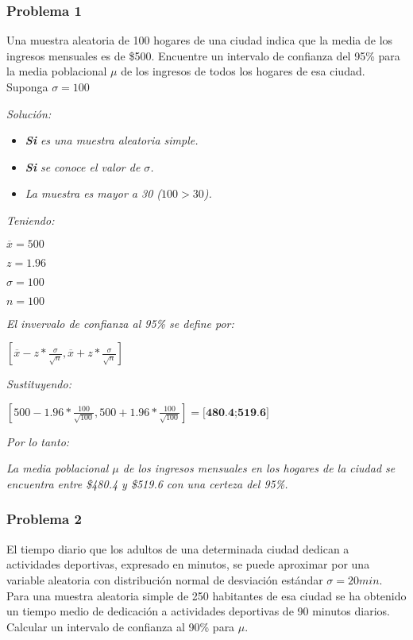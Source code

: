 \documentclass[a4paper, 12pt]{article}
\begin{document}
\subsubsection{Problema 1}
Una muestra aleatoria de 100 hogares de una ciudad indica que la media de los ingresos mensuales es de \$500. Encuentre un intervalo de confianza del 95\% para la media poblacional $\mu$ de los ingresos de todos los hogares de esa ciudad. Suponga $\sigma=100$

\emph{Solución:}

\begin{itemize}
    \item \emph{\textbf{Si} es una muestra aleatoria simple.}
    \item \emph{\textbf{Si} se conoce el valor de $\sigma$.}
    \item \emph{La muestra es mayor a 30 ($100>30$).}
\end{itemize}

\emph{Teniendo:}

$\overline{x}=500$

$z=1.96$

$\sigma=100$

$n=100$

\emph{El invervalo de confianza al 95\% se define por:}

$[\overline{x}-z*\frac{\sigma}{\sqrt{n}}, \overline{x}+z*\frac{\sigma}{\sqrt{n}}]$

\emph{Sustituyendo:}

$[500-1.96*\frac{100}{\sqrt{100}}, 500+1.96*\frac{100}{\sqrt{100}}]=\textbf{[480.4;519.6]}$

\emph{Por lo tanto:}

\emph{La media poblacional $\mu$ de los ingresos mensuales en los hogares de la ciudad se encuentra entre \$480.4 y \$519.6 con una certeza del 95\%.}

\subsubsection{Problema 2}
El tiempo diario que los adultos de una determinada ciudad dedican a actividades deportivas, expresado en minutos, se puede aproximar por una variable aleatoria con distribución normal de desviación estándar $\sigma=20min$. Para una muestra aleatoria simple de 250 habitantes de esa ciudad se ha obtenido un tiempo medio de dedicación a actividades deportivas de 90 minutos diarios. Calcular un intervalo de confianza al 90\% para $\mu$.
\end{document}
